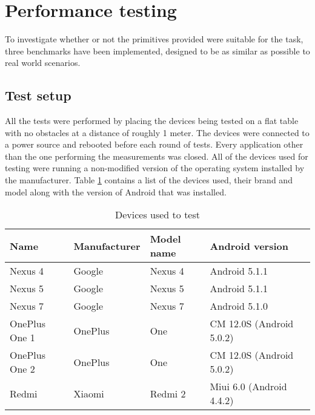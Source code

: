 \section{Performance testing}
To investigate whether or not the primitives provided were suitable for the task, three benchmarks have been implemented, designed to be as similar as possible to real world scenarios.

\subsection{Test setup}
All the tests were performed by placing the devices being tested on a flat table with no obstacles at a distance of roughly 1 meter.
The devices were connected to a power source and rebooted before each round of tests.
Every application other than the one performing the measurements was closed.
All of the devices used for testing were running a non-modified version of the operating system installed by the manufacturer.
Table \ref{table:devices-used} contains a list of the devices used, their brand and model along with the version of Android that was installed.


\begin{table}[h]
\centering
\caption{Devices used to test}
\label{table:devices-used}
\begin{tabular}{lllll}
\hline
Name          & Manufacturer      & Model name      & Android version           \\ \hline
Nexus 4       & Google            & Nexus 4         & Android 5.1.1             \\
Nexus 5       & Google            & Nexus 5         & Android 5.1.1             \\
Nexus 7       & Google            & Nexus 7         & Android 5.1.0             \\
OnePlus One 1 & OnePlus           & One             & CM 12.0S (Android 5.0.2)  \\
OnePlus One 2 & OnePlus           & One             & CM 12.0S (Android 5.0.2)  \\
Redmi         & Xiaomi            & Redmi 2         & Miui 6.0 (Android 4.4.2)  \\ 
\hline
\end{tabular}
\end{table}




